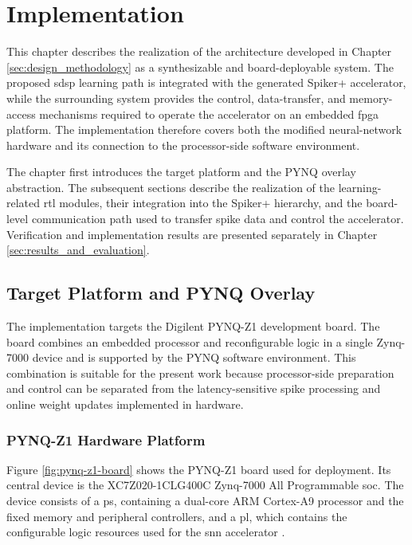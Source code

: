 \chapter{Implementation}
\label{sec:implementation}

This chapter describes the realization of the architecture developed in Chapter \ref{sec:design_methodology} as a synthesizable and board-deployable system. The proposed \gls{sdsp} learning path is integrated with the generated Spiker+ accelerator, while the surrounding system provides the control, data-transfer, and memory-access mechanisms required to operate the accelerator on an embedded \gls{fpga} platform. The implementation therefore covers both the modified neural-network hardware and its connection to the processor-side software environment.

The chapter first introduces the target platform and the PYNQ overlay abstraction. The subsequent sections describe the realization of the learning-related \gls{rtl} modules, their integration into the Spiker+ hierarchy, and the board-level communication path used to transfer spike data and control the accelerator. Verification and implementation results are presented separately in Chapter \ref{sec:results_and_evaluation}.

\section{Target Platform and PYNQ Overlay}
\label{subsec:target-platform-and-overlay}

The implementation targets the Digilent PYNQ-Z1 development board. The board combines an embedded processor and reconfigurable logic in a single Zynq-7000 device and is supported by the PYNQ software environment. This combination is suitable for the present work because processor-side preparation and control can be separated from the latency-sensitive spike processing and online weight updates implemented in hardware.

\subsection{PYNQ-Z1 Hardware Platform}

Figure \ref{fig:pynq-z1-board} shows the PYNQ-Z1 board used for deployment. Its central device is the XC7Z020-1CLG400C Zynq-7000 All Programmable \gls{soc}. The device consists of a \gls{ps}, containing a dual-core ARM Cortex-A9 processor and the fixed memory and peripheral controllers, and a \gls{pl}, which contains the configurable logic resources used for the \gls{snn} accelerator \cite{DigilentPYNQZ1Manual}.

